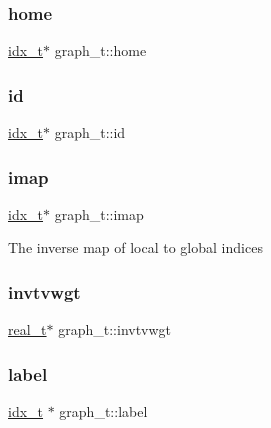 \subsubsection{\texorpdfstring{home}{home}}
{\footnotesize\ttfamily \hyperlink{3rd_party_2parmetis-4_80_83_2metis_2include_2metis_8h_aaa5262be3e700770163401acb0150f52}{idx\+\_\+t}$\ast$ graph\+\_\+t\+::home}

\mbox{\label{structgraph__t_a09e4ad93b604f774a96eee64b603135b}} 
\subsubsection{\texorpdfstring{id}{id}}
{\footnotesize\ttfamily \hyperlink{3rd_party_2parmetis-4_80_83_2metis_2include_2metis_8h_aaa5262be3e700770163401acb0150f52}{idx\+\_\+t}$\ast$ graph\+\_\+t\+::id}

\mbox{\label{structgraph__t_a6a2f7b7ac13bbaac6fd37c2a40b8b8e8}} 
\subsubsection{\texorpdfstring{imap}{imap}}
{\footnotesize\ttfamily \hyperlink{3rd_party_2parmetis-4_80_83_2metis_2include_2metis_8h_aaa5262be3e700770163401acb0150f52}{idx\+\_\+t}$\ast$ graph\+\_\+t\+::imap}

The inverse map of local to global indices \mbox{\label{structgraph__t_a25c1b2aeb241430033fb752ba11b5cbb}} 
\subsubsection{\texorpdfstring{invtvwgt}{invtvwgt}}
{\footnotesize\ttfamily \hyperlink{3rd_party_2parmetis-4_80_83_2metis_2include_2metis_8h_a1924a4f6907cc3833213aba1f07fcbe9}{real\+\_\+t}$\ast$ graph\+\_\+t\+::invtvwgt}

\mbox{\label{structgraph__t_ab2ae2df953d94b5ca663e8e6cf8a2aa4}} 
\subsubsection{\texorpdfstring{label}{label}}
{\footnotesize\ttfamily \hyperlink{3rd_party_2parmetis-4_80_83_2metis_2include_2metis_8h_aaa5262be3e700770163401acb0150f52}{idx\+\_\+t} $\ast$ graph\+\_\+t\+::label}

